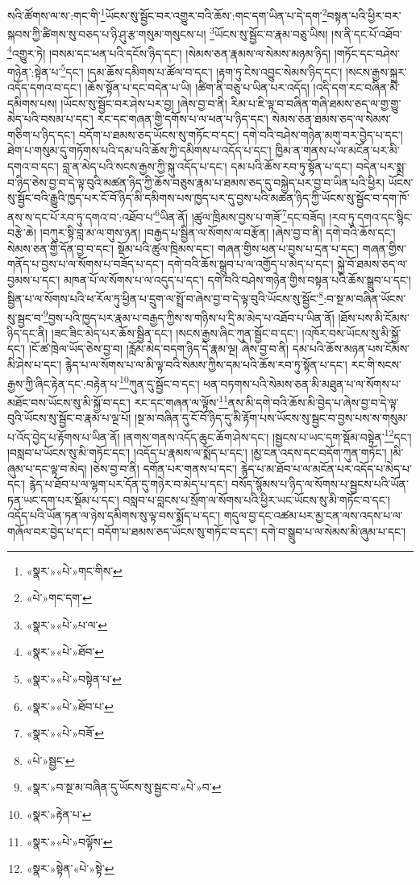 སའི་ཚོགས་ལ་ས་:གང་གི་\footnote{«སྣར་»«པེ་»གང་གིས་}ཡོངས་སུ་སྦྱོང་བར་འགྱུར་བའི་ཆོས་:གང་དག་ཡིན་པ་དེ་དག་\footnote{«པེ་»གང་དག་}བསྟན་པའི་ཕྱིར་བར་སྐབས་ཀྱི་ཚིགས་སུ་བཅད་པ་ཉི་ཤུ་རྩ་གསུམ་གསུངས་པ། \footnote{«སྣར་»«པེ་»པ་ལ་}ཡོངས་སུ་སྦྱོང་བ་རྣམ་བཅུ་ཡིས། །ས་ནི་དང་པོ་འཐོབ་\footnote{«སྣར་»«པེ་»ཐོབ་}འགྱུར་ཏེ། །བསམ་དང་ཕན་པའི་དངོས་ཉིད་དང་། །སེམས་ཅན་རྣམས་ལ་སེམས་མཉམ་ཉིད། །གཏོང་དང་བཤེས་གཉེན་:སྟེན་པ་\footnote{«སྣར་»«པེ་»བསྟེན་པ་}དང་། །དམ་ཆོས་དམིགས་པ་ཚོལ་བ་དང་། །རྟག་ཏུ་ངེས་འབྱུང་སེམས་ཉིད་དང་། །སངས་རྒྱས་སྐུར་འདོད་དགའ་བ་དང་། །ཆོས་སྟོན་པ་དང་བདེན་པ་ཡི། །ཚིག་ནི་བཅུ་པ་ཡིན་པར་འདོད། །འདི་དག་རང་བཞིན་མི་དམིགས་པས། །ཡོངས་སུ་སྦྱོང་བར་ཤེས་པར་བྱ། །ཞེས་བྱ་བ་ནི། རིམ་པ་ཇི་ལྟ་བ་བཞིན་གཞི་ཐམས་ཅད་ལ་གྱ་གྱུ་མེད་པའི་བསམ་པ་དང་། རང་དང་གཞན་གྱི་དགོས་པ་ལ་ཕན་པ་ཉིད་དང་། སེམས་ཅན་ཐམས་ཅད་ལ་སེམས་གཅིག་པ་ཉིད་དང་། བདོག་པ་ཐམས་ཅད་ཡོངས་སུ་གཏོང་བ་དང་། དགེ་བའི་བཤེས་གཉེན་མགུ་བར་བྱེད་པ་དང་། ཐེག་པ་གསུམ་དུ་གཏོགས་པའི་དམ་པའི་ཆོས་ཀྱི་དམིགས་པ་འདོད་པ་དང་། ཁྱིམ་ན་གནས་པ་ལ་མངོན་པར་མི་དགའ་བ་དང་། བླ་ན་མེད་པའི་སངས་རྒྱས་ཀྱི་སྐུ་འདོད་པ་དང་། དམ་པའི་ཆོས་རབ་ཏུ་སྟོན་པ་དང་། བདེན་པར་སྨྲ་བ་ཉིད་ཅེས་བྱ་བ་དེ་ལྟ་བུའི་མཚན་ཉིད་ཀྱི་ཆོས་བཅུས་རྣམ་པ་ཐམས་ཅད་དུ་བསྐྱེད་པར་བྱ་བ་ཡིན་པའི་ཕྱིར། ཡོངས་སུ་སྦྱོང་བའི་རྒྱུའི་ཁྱད་པར་ངོ་བོ་ཉིད་མི་དམིགས་པས་ཁྱད་པར་དུ་བྱས་པའི་མཚན་ཉིད་ཀྱི་ཡོངས་སུ་སྦྱོང་བ་དག་ཁོ་ནས་ས་དང་པོ་རབ་ཏུ་དགའ་བ་:འཐོབ་པ་\footnote{«སྣར་»«པེ་»ཐོབ་པ་}ཡིན་ནོ། །ཚུལ་ཁྲིམས་བྱས་པ་གཟོ་\footnote{«སྣར་»«པེ་»བཟོ་}དང་བཟོད། །རབ་ཏུ་དགའ་དང་སྙིང་བརྩེ་ཆེ། །བཀུར་སྟི་བླ་མ་ལ་གུས་ཉན། །བརྒྱད་པ་སྦྱིན་ལ་སོགས་ལ་བརྩོན། །ཞེས་བྱ་བ་ནི། དགེ་བའི་ཆོས་དང་། སེམས་ཅན་གྱི་དོན་བྱ་བ་དང་། སྡོམ་པའི་ཚུལ་ཁྲིམས་དང་། གཞན་གྱིས་ཕན་པ་བྱས་པ་དྲན་པ་དང་། གཞན་གྱིས་གནོད་པ་བྱས་པ་ལ་སོགས་པ་བཟོད་པ་དང་། དགེ་བའི་ཆོས་སྒྲུབ་པ་ལ་འགྱོད་པ་མེད་པ་དང་། སྐྱེ་བོ་ཐམས་ཅད་ལ་བྱམས་པ་དང་། མཁན་པོ་ལ་སོགས་པ་ལ་འདུད་པ་དང་། དགེ་བའི་བཤེས་གཉེན་གྱིས་བསྟན་པའི་ཆོས་སྒྲུབ་པ་དང་། སྦྱིན་པ་ལ་སོགས་པའི་ཕ་རོལ་ཏུ་ཕྱིན་པ་དྲུག་ལ་སྤྲོ་བ་ཞེས་བྱ་བ་དེ་ལྟ་བུའི་ཡོངས་སུ་སྦྱོང་\footnote{«པེ་»སྦྱང་}:བ་སྔ་མ་བཞིན་ཡོངས་སུ་སྦྱང་བ་\footnote{«སྣར་»བ་སྔ་མ་བཞིན་དུ་ཡོངས་སུ་སྦྱང་བ་«པེ་»བ་}བྱས་པའི་ཁྱད་པར་རྣམ་པ་བརྒྱད་ཀྱིས་ས་གཉིས་པ་དྲི་མ་མེད་པ་འཐོབ་པ་ཡིན་ནོ། །ཐོས་པས་མི་ངོམས་ཉིད་དང་ནི། །ཟང་ཟིང་མེད་པར་ཆོས་སྦྱིན་དང་། །སངས་རྒྱས་ཞིང་ཀུན་སྦྱོང་བ་དང་། །འཁོར་བས་ཡོངས་སུ་མི་སྐྱོ་དང་། །ངོ་ཚ་ཁྲེལ་ཡོད་ཅེས་བྱ་བ། །རློམ་མེད་བདག་ཉིད་དེ་རྣམ་ལྔ། ཞེས་བྱ་བ་ནི། དམ་པའི་ཆོས་མཉན་པས་ངོམས་མི་ཤེས་པ་དང་། རྙེད་པ་ལ་སོགས་པ་ལ་མི་ལྟ་བའི་སེམས་ཀྱིས་དམ་པའི་ཆོས་རབ་ཏུ་སྟོན་པ་དང་། རང་གི་སངས་རྒྱས་ཀྱི་ཞིང་རྟེན་དང་:བརྟེན་པ་\footnote{«སྣར་»རྟེན་པ་}ཀུན་དུ་སྦྱོང་བ་དང་། ཕན་བཏགས་པའི་སེམས་ཅན་མི་མཐུན་པ་ལ་སོགས་པ་མཐོང་བས་ཡོངས་སུ་མི་སྐྱོ་བ་དང་། རང་དང་གཞན་ལ་ལྟོས་\footnote{«སྣར་»«པེ་»བལྟོས་}ནས་མི་དགེ་བའི་ཆོས་མི་བྱེད་པ་ཞེས་བྱ་བ་དེ་ལྟ་བུའི་ཡོངས་སུ་སྦྱོང་བ་རྣམ་པ་ལྔ་པོ། །སྔ་མ་བཞིན་དུ་ངོ་བོ་ཉིད་དུ་མི་རྟོག་པས་ཡོངས་སུ་སྦྱང་བ་བྱས་པས་ས་གསུམ་པ་འོད་བྱེད་པ་རྟོགས་པ་ཡིན་ནོ། །ནགས་གནས་འདོད་ཆུང་ཆོག་ཤེས་དང་། །སྦྱངས་པ་ཡང་དག་སྡོམ་བསྟེན་\footnote{«སྣར་»སྟེན་«པེ་»སྟེ་}དང་། །བསླབ་པ་ཡོངས་སུ་མི་གཏོང་དང་། །འདོད་པ་རྣམས་ལ་སྨོད་པ་དང་། །མྱ་ངན་འདས་དང་བདོག་ཀུན་གཏོང་། །མི་ཞུམ་པ་དང་ལྟ་བ་མེད། །ཅེས་བྱ་བ་ནི། དགོན་པར་གནས་པ་དང་། རྙེད་པ་མ་ཐོབ་པ་ལ་མངོན་པར་འདོད་པ་མེད་པ་དང་། རྙེད་པ་ཐོབ་པ་ལ་ལྷག་པར་དོན་དུ་གཉེར་བ་མེད་པ་དང་། བསོད་སྙོམས་པ་ཉིད་ལ་སོགས་པ་སྦྱངས་པའི་ཡོན་ཏན་ཡང་དག་པར་སྡོམ་པ་དང་། བསླབ་པ་བླངས་པ་སྲོག་ལ་སོགས་པའི་ཕྱིར་ཡང་ཡོངས་སུ་མི་གཏོང་བ་དང་། འདོད་པའི་ཡོན་ཏན་ལ་ཉེས་དམིགས་སུ་ལྟ་བས་སྨོད་པ་དང་། གདུལ་བྱ་དང་འཚམ་པར་མྱ་ངན་ལས་འདས་པ་ལ་གཞོལ་བར་བྱེད་པ་དང་། བདོག་པ་ཐམས་ཅད་ཡོངས་སུ་གཏོང་བ་དང་། དགེ་བ་སྒྲུབ་པ་ལ་སེམས་མི་ཞུམ་པ་དང་། 